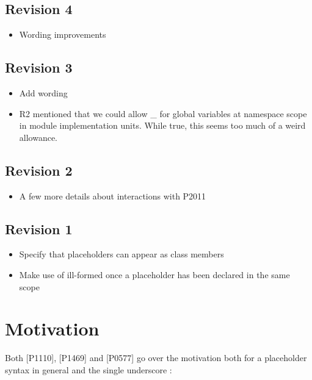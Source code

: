 \documentclass{wg21}
\begin{document}
\subsection{Revision 4}

\begin{itemize}
\item Wording improvements
\end{itemize}

\subsection{Revision 3}

\begin{itemize}
\item Add wording
\item R2 mentioned that we could allow _ for global variables at namespace scope in module implementation units. While true, this seems too much of a weird allowance.
\end{itemize}

\subsection{Revision 2}

\begin{itemize}
    \item A few more details about interactions with P2011
\end{itemize}

\subsection{Revision 1}

\begin{itemize}
   \item Specify that placeholders can appear as class members
   \item Make use of \tcode{_} ill-formed once a placeholder has been declared in the same scope
\end{itemize}

\section{Motivation}

Both [P1110]\cite{P1110R0}, [P1469]\cite{P1469R0} and [P0577]\cite{P0577R0} go over the motivation both for a placeholder syntax in general and
the single underscore \tcode{_}:
\end{document}
